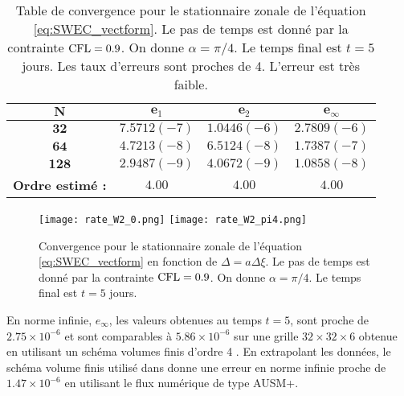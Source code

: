 \begin{table}[htbp]
\begin{center}
\begin{tabular}{|c||c|c|c|}
\hline 
$\mathbf{N}$ & $\mathbf{e}_1$ & $\mathbf{e}_2$ & $\mathbf{e}_{\infty}$ \\ 
\hline 
\hline 
$\mathbf{32}$ & $7.5712(-7)$ & $1.0446(-6)$ & $2.7809(-6)$\\ 

$\mathbf{64}$ & $4.7213(-8)$ & $6.5124(-8)$ & $1.7387(-7)$\\ 

$\mathbf{128}$ & $2.9487(-9)$ & $4.0672(-9)$ & $1.0858(-8)$\\

\hline
\textbf{Ordre estimé :} & $4.00$ & $4.00$ & $4.00$\\ 
\hline
\end{tabular} 
\end{center}
\caption{Table de convergence pour le stationnaire zonale de l'équation \eqref{eq:SWEC_vectform}. Le pas de temps est donné par la contrainte $\text{CFL}=0.9$. On donne $\alpha = \pi/4$. Le temps final est $t=5$ jours. Les taux d'erreurs sont proches de 4. L'erreur est très faible.}
\label{tab:rate_swe2}
\end{table}

\begin{figure}[htbp]
\begin{center}
\texttt{[image: rate\_W2\_0.png]}
\texttt{[image: rate\_W2\_pi4.png]}
\end{center}
\caption{Convergence pour le stationnaire zonale de l'équation \eqref{eq:SWEC_vectform} en fonction de $\Delta = a \Delta \xi$. Le pas de temps est donné par la contrainte $\text{CFL}=0.9$. On donne $\alpha = \pi/4$. Le temps final est $t=5$ jours.}
\label{fig:rate_swe12}
\end{figure}

En norme infinie, $e_{\infty}$, les valeurs obtenues au temps $t=5$, sont proche de $2.75 \times 10^{-6}$ et sont comparables à $5.86 \times 10^{-6}$ sur une grille $32 \times 32 \times 6$ obtenue en utilisant un schéma volumes finis d'ordre 4 \cite{Chen2008}. En extrapolant les données, le schéma volume finis utilisé dans \cite{Ullrich2011} donne une erreur en norme infinie proche de $1.47 \times 10^{-6}$ en utilisant le flux numérique de type AUSM+.

















